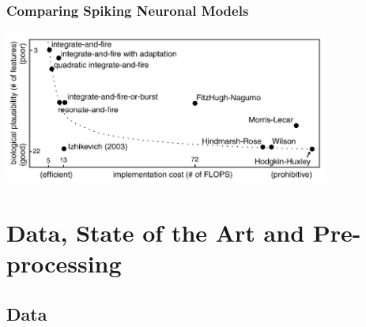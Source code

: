 \documentclass[aspectratio=169, 11pt]{beamer}
\begin{document}
\begin{frame}
  \frametitle{Comparing Spiking Neuronal Models}
  \begin{center}
    \includegraphics[width=0.8\textwidth]{image/theo1.png}
  \end{center}
\end{frame}

\section{Data, State of the Art and Pre-processing}

\subsection{Data}
\end{document}
